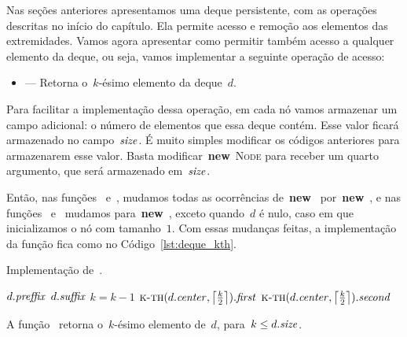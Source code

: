 \documentclass[../../main.tex]{subfiles}
\begin{document}
Nas seções anteriores apresentamos uma deque persistente, com as operações descritas no início do capítulo. Ela permite acesso e remoção aos elementos das extremidades. Vamos agora apresentar como permitir também acesso a qualquer elemento da deque, ou seja, vamos implementar a seguinte operação de acesso:

\begin{itemize}
    \item {} --- Retorna o~$k$-ésimo elemento da deque~$d$.
\end{itemize}

Para facilitar a implementação dessa operação, em cada nó vamos armazenar um campo adicional: o número de elementos que essa deque contém. Esse valor ficará armazenado no campo~$\mathit{size}$. É muito simples modificar os códigos anteriores para armazenarem esse valor. Basta modificar~\mbox{\textbf{new} \textsc{Node}} para receber um quarto argumento, que será armazenado em~$\mathit{size}$.

Então, nas funções~ e~, mudamos todas as ocorrências de~\mbox{\textbf{new} } por~\mbox{\textbf{new} }, e nas funções~ e~ mudamos para~\mbox{\textbf{new} }, exceto quando~$d$ é nulo, caso em que inicializamos o nó com tamanho~$1$.
Com essas mudanças feitas, a implementação da função fica como no Código~\ref{lst:deque_kth}.

\begin{algorithm}
\caption{Implementação de~.} \label{lst:deque_kth}
\begin{algorithmic}[1]

        \State \Return $d.\mathit{preffix}$\label{line:kth:if1}
    \EndIf
        \State \Return $d.\mathit{suffix}$ \label{line:kth:if2}
    \EndIf
        \State $k = k - 1$ \label{line:kth:if3}
    \EndIf
        \State \Return $\Call{k-th}{d.\V{center}, \ceil*{\frac{k}{2}}}.\V{first}$
    \Else
        \State \Return $\Call{k-th}{d.\V{center}, \ceil*{\frac{k}{2}}}.\V{second}$
    \EndIf
\EndFunction

\end{algorithmic}
\end{algorithm}


\begin{proposition}
A função~ retorna o~$k$-ésimo elemento de~$d$, para~$k \leq d.\mathit{size}$.
\end{proposition}
\end{document}
